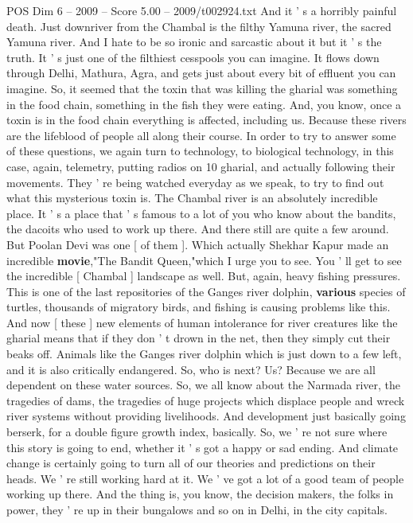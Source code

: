 \begin{textsample}{POS Dim 6 – 2009 – Score 5.00 – 2009/t002924.txt}
And it ' s a horribly painful death.
Just downriver from the Chambal is the filthy Yamuna river, the sacred Yamuna river.
And I hate to be so ironic and sarcastic about it but it ' s the truth.
It ' s just one of the filthiest cesspools you can imagine.
It flows down through Delhi, Mathura, Agra, and gets just about every bit of effluent you can imagine.
So, it seemed that the toxin that was killing the gharial was something in the food chain, something in the fish they were eating.
And, you know, once a toxin is in the food chain everything is affected, including us.
Because these rivers are the lifeblood of people all along their course.
In order to try to answer some of these questions, we again turn to technology, to biological technology, in this case, again, telemetry, putting radios on 10 gharial, and actually following their movements.
They ' re being watched everyday as we speak, to try to find out what this mysterious toxin is.
The Chambal river is an absolutely incredible place.
It ' s a place that ' s famous to a lot of you who know about the bandits, the dacoits who used to work up there.
And there still are quite a few around.
But Poolan Devi was one [ of them ].
Which actually Shekhar Kapur made an incredible \textbf{movie},"The Bandit Queen,"which I urge you to see.
You ' ll get to see the incredible [ Chambal ] landscape as well.
But, again, heavy fishing pressures.
This is one of the last repositories of the Ganges river dolphin, \textbf{various} species of turtles, thousands of migratory birds, and fishing is causing problems like this.
And now [ these ] new elements of human intolerance for river creatures like the gharial means that if they don ' t drown in the net, then they simply cut their beaks off.
Animals like the Ganges river dolphin which is just down to a few left, and it is also critically endangered.
So, who is next?
Us?
Because we are all dependent on these water sources.
So, we all know about the Narmada river, the tragedies of dams, the tragedies of huge projects which displace people and wreck river systems without providing livelihoods.
And development just basically going berserk, for a double figure growth index, basically.
So, we ' re not sure where this story is going to end, whether it ' s got a happy or sad ending.
And climate change is certainly going to turn all of our theories and predictions on their heads.
We ' re still working hard at it.
We ' ve got a lot of a good team of people working up there.
And the thing is, you know, the decision makers, the folks in power, they ' re up in their bungalows and so on in Delhi, in the city capitals.

\end{textsample}
